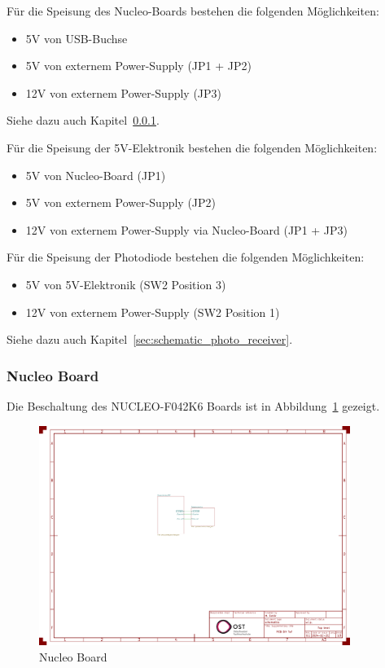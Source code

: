\documentclass[11pt,a4paper,hidelinks]{article}
\begin{document}
Für die Speisung des Nucleo-Boards bestehen die folgenden Möglichkeiten:

\begin{itemize}
    \item 5V von USB-Buchse
    \item 5V von externem Power-Supply (JP1 + JP2)
    \item 12V von externem Power-Supply (JP3)
\end{itemize}

Siehe dazu auch Kapitel~\ref{sec:schematic_nucleo}.

Für die Speisung der 5V-Elektronik bestehen die folgenden Möglichkeiten:

\begin{itemize}
    \item 5V von Nucleo-Board (JP1)
    \item 5V von externem Power-Supply (JP2)
    \item 12V von externem Power-Supply via Nucleo-Board (JP1 + JP3)
\end{itemize}

Für die Speisung der Photodiode bestehen die folgenden Möglichkeiten:

\begin{itemize}
    \item 5V von 5V-Elektronik (SW2 Position 3)
    \item 12V von externem Power-Supply (SW2 Position 1)
\end{itemize}

Siehe dazu auch Kapitel~\ref{sec:schematic_photo_receiver}.

\subsubsection{Nucleo Board}\label{sec:schematic_nucleo}

Die Beschaltung des NUCLEO-F042K6 Boards \cite{st2024nucleof042k6_usermanual} ist in Abbildung~\ref{fig:nucleo_board}
gezeigt.

\begin{figure}[H]
    \centering
    \includegraphics[page=2, trim=530 580 300 50, clip, width=0.9\textwidth]{attachments/schematic.pdf}
    \caption{Nucleo Board}\label{fig:nucleo_board}
\end{figure}
\end{document}
